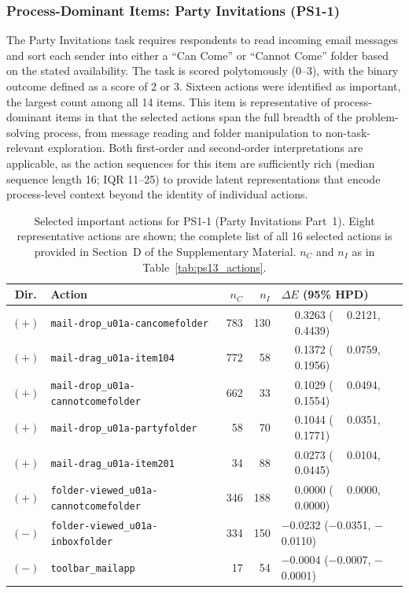 \documentclass[A4paper,11pt]{article}
\begin{document}
\subsubsection{Process-Dominant Items: Party Invitations (PS1-1)}

The Party Invitations task requires respondents to read incoming email messages and sort each sender into either a ``Can Come'' or ``Cannot Come'' folder based on the stated availability. The task is scored polytomously (0--3), with the binary outcome defined as a score of 2 or 3. Sixteen actions were identified as important, the largest count among all 14 items. This item is representative of process-dominant items in that the selected actions span the full breadth of the problem-solving process, from message reading and folder manipulation to non-task-relevant exploration. Both first-order and second-order interpretations are applicable, as the action sequences for this item are sufficiently rich (median sequence length 16; IQR 11--25) to provide latent representations that encode process-level context beyond the identity of individual actions.

\begin{table}[htb]
\centering
\caption{Selected important actions for PS1-1 (Party Invitations Part~1). Eight representative actions are shown; the complete list of all 16 selected actions is provided in Section~D of the Supplementary Material. $n_C$ and $n_I$ as in Table~\ref{tab:ps13_actions}.}
\label{tab:ps11_actions}
\small
\begin{tabular}{clrrl}
\toprule
Dir. & Action & $n_C$ & $n_I$ & $\Delta E$ (95\% HPD) \\
\midrule
$(+)$ & \texttt{mail-drop\_u01a-cancomefolder}     & 783 & 130 & $\phantom{-}$0.3263 ($\phantom{-}$0.2121, $\phantom{-}$0.4439) \\
$(+)$ & \texttt{mail-drag\_u01a-item104}           & 772 &  58 & $\phantom{-}$0.1372 ($\phantom{-}$0.0759, $\phantom{-}$0.1956) \\
$(+)$ & \texttt{mail-drop\_u01a-cannotcomefolder}  & 662 &  33 & $\phantom{-}$0.1029 ($\phantom{-}$0.0494, $\phantom{-}$0.1554) \\
$(+)$ & \texttt{mail-drop\_u01a-partyfolder}       &  58 &  70 & $\phantom{-}$0.1044 ($\phantom{-}$0.0351, $\phantom{-}$0.1771) \\
$(+)$ & \texttt{mail-drag\_u01a-item201}           &  34 &  88 & $\phantom{-}$0.0273 ($\phantom{-}$0.0104, $\phantom{-}$0.0445) \\
$(+)$ & \texttt{folder-viewed\_u01a-cannotcomefolder} & 346 & 188 & $\phantom{-}$0.0000 ($\phantom{-}$0.0000, $\phantom{-}$0.0000) \\
$(-)$ & \texttt{folder-viewed\_u01a-inboxfolder}  & 334 & 150 & $-$0.0232 ($-$0.0351, $-$0.0110) \\
$(-)$ & \texttt{toolbar\_mailapp}                 &  17 &  54 & $-$0.0004 ($-$0.0007, $-$0.0001) \\
\bottomrule
\end{tabular}
\end{table}
\end{document}
